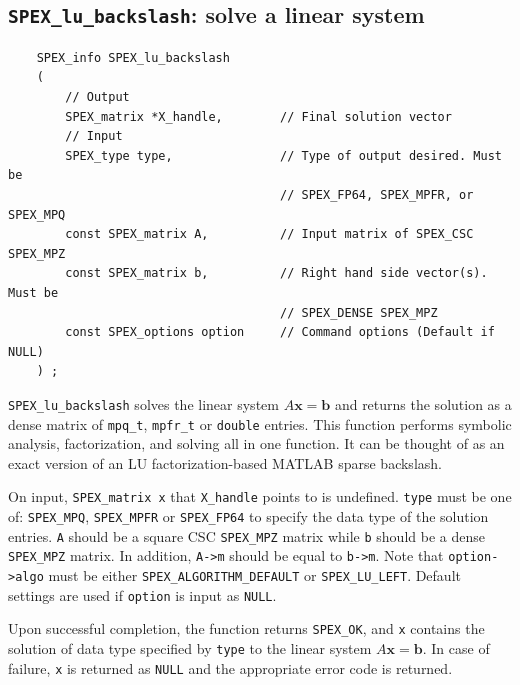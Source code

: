 \documentclass[12pt,oneside]{book}
\theoremstyle{definition}
\renewcommand{\b}{\mathbf{b}}
\newcommand{\x}{\mathbf{x}}
\begin{document}
\subsection{\texttt{SPEX\_lu\_backslash}: solve a linear system}
\label{ss:SPEX_Left_LU_backslash}
\begin{mdframed}[userdefinedwidth=\textwidth]
{\footnotesize
\begin{verbatim}
    SPEX_info SPEX_lu_backslash
    (
        // Output
        SPEX_matrix *X_handle,        // Final solution vector
        // Input
        SPEX_type type,               // Type of output desired. Must be
                                      // SPEX_FP64, SPEX_MPFR, or SPEX_MPQ
        const SPEX_matrix A,          // Input matrix of SPEX_CSC SPEX_MPZ
        const SPEX_matrix b,          // Right hand side vector(s). Must be
                                      // SPEX_DENSE SPEX_MPZ 
        const SPEX_options option     // Command options (Default if NULL)
    ) ;
\end{verbatim}
} \end{mdframed}

\verb|SPEX_lu_backslash| solves the linear system $A \x= \b$ and returns the solution
as a dense matrix of \verb|mpq_t|, \verb|mpfr_t| or \verb|double| entries. This
function performs symbolic analysis, factorization, and solving all in one function. 
It can be thought of as an exact version of an LU factorization-based MATLAB sparse backslash.

On input, \verb|SPEX_matrix x| that \verb|X_handle| points to is undefined. \verb|type| must be one of:
\verb|SPEX_MPQ|, \verb|SPEX_MPFR| or \verb|SPEX_FP64| to specify the data type
of the solution entries. \verb|A| should be a square CSC \verb|SPEX_MPZ| matrix
while \verb|b| should be a dense \verb|SPEX_MPZ| matrix. In addition, \verb|A->m|
should be equal to \verb|b->m|.
Note that \verb|option->algo| must be either \verb|SPEX_ALGORITHM_DEFAULT| or 
\verb|SPEX_LU_LEFT|. Default settings are used if
\verb|option| is input as \verb|NULL|.

Upon successful completion, the function returns \verb|SPEX_OK|, and
\verb|x| contains the solution of data type specified by
\verb|type| to the linear system $A\x=\b$. In case of failure, \verb|x| is returned as \verb|NULL| and the appropriate error code is returned.
\end{document}
